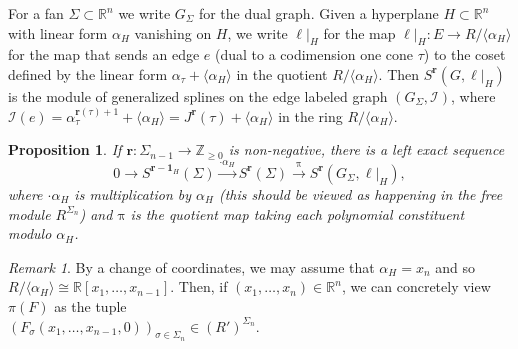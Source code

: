\documentclass[11pt, reqno]{amsart}
\newcommand{\RR}{\mathbb{R}}
\newcommand{\ZZ}{\mathbb{Z}}
\newcommand{\br}{\mathbf{r}}
\newtheorem{proposition}[theorem]{Proposition}
\theoremstyle{definition}
\theoremstyle{remark}
\newtheorem{remark}[theorem]{Remark}
\numberwithin{equation}{section}
\begin{document}
For a fan $\Sigma\subset\RR^n$ we write $G_{\Sigma}$ for the dual graph.  Given a hyperplane $H\subset\RR^n$ with linear form $\alpha_H$ vanishing on $H$, we write $\ell|_H$ for the map $\ell|_H:E\to R/\langle \alpha_H\rangle$ for the map that sends an edge $e$ (dual to a codimension one cone $\tau$) to the coset defined by the linear form $\alpha_\tau+\langle \alpha_H\rangle$ in the quotient $R/\langle\alpha_H\rangle$.  Then $S^{\br}(G,\ell|_H)$ is the module of generalized splines on the edge labeled graph $(G_{\Sigma},\mathcal{I})$, where $\mathcal{I}(e)=\alpha_\tau^{\br(\tau)+1}+\langle \alpha_H\rangle=J^{\br}(\tau)+\langle \alpha_H\rangle$ in the ring $R/\langle \alpha_H\rangle$.

\begin{proposition}\label{prop:first-sequence}
If $\br:\Sigma_{n-1}\to\ZZ_{\ge 0}$ is non-negative, there is a left exact sequence
\[
0\rightarrow S^{\br-\mathbf{1}_H}(\Sigma) \xrightarrow{\cdot \alpha_H} S^{\br}(\Sigma)\xrightarrow{\mathrm{\pi}} S^{\br}(G_{\Sigma},\ell|_H),
\]
where $\cdot\alpha_H$ is multiplication by $\alpha_H$ (this should be viewed as happening in the free module $R^{\Sigma_n}$) and $\mathrm{\pi}$ is the quotient map taking each polynomial constituent modulo $\alpha_H$.
\end{proposition}
\begin{remark}
By a change of coordinates, we may assume that $\alpha_H=x_n$ and so $R/\langle \alpha_H\rangle\cong \RR[x_1,\ldots,x_{n-1}]$.  Then, if $(x_1,\ldots,x_n)\in \RR^n$, we can concretely view $\pi(F)$ as the tuple\\ $(F_\sigma(x_1,\ldots,x_{n-1},0))_{\sigma\in\Sigma_n}\in (R')^{\Sigma_n}$.
\end{remark}
\end{document}
